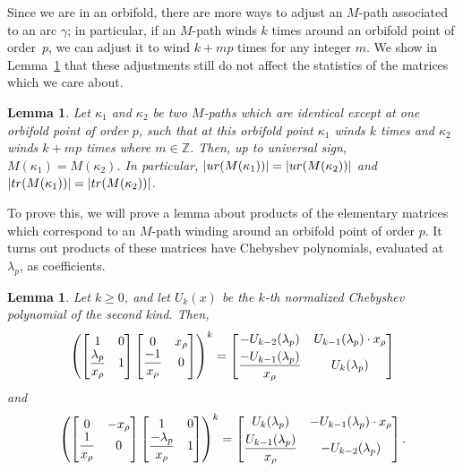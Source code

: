 \documentclass[11pt]{article}
\newcommand{\Z}{\mathbb{Z}}
\numberwithin{equation}{section}
\newtheorem{Lemma}[Theorem]{Lemma}
\begin{document}
Since we are in an orbifold, there are more ways to adjust an $M$-path associated to an arc $\gamma$; in particular, if an $M$-path winds $k$ times around an orbifold point of order~$p$, we can adjust it to wind $k + m p$ times for any integer $m$. We show in Lemma~\ref{lem:Mpathdontcare} that these adjustments still do not affect the statistics of the matrices which we care about.

\begin{Lemma}\label{lem:Mpathdontcare}
Let $\kappa_1$ and $\kappa_2$ be two $M$-paths which are identical except at one orbifold point of order $p$, such that at this orbifold point $\kappa_1$ winds $k$ times and $\kappa_2$ winds $k + mp$ times where $m \in \Z$. Then, up to universal sign, $M(\kappa_1) = M(\kappa_2)$. In particular, $\vert {\rm ur}(M(\kappa_1)) \vert = \vert {\rm ur}(M(\kappa_2))\vert$ and $\vert {\rm tr}(M(\kappa_1)) \vert = \vert {\rm tr}(M(\kappa_2)) \vert $.
\end{Lemma}

To prove this, we will prove a lemma about products of the elementary matrices which correspond to an $M$-path winding around an orbifold point of order $p$. It turns out products of these matrices have Chebyshev polynomials, evaluated at~$\lambda_p$, as coefficients.

\begin{Lemma} \label{lem:ChebyshevMatrices}
Let $k \geq 0$, and let $U_k(x)$ be the $k$-th normalized Chebyshev polynomial of the second kind. Then,
\begin{equation}\label{eqn:chebymatrix}
\left( \begin{bmatrix} 1 & 0 \\ \dfrac{\lambda_p}{x_\rho} & 1 \end{bmatrix} \begin{bmatrix} 0 & x_\rho \\ \dfrac{-1}{x_\rho} & 0 \end{bmatrix} \right)^k = \begin{bmatrix} -U_{k-2} (\lambda_p) & U_{k-1}(\lambda_p) \cdot x_\rho \vspace{1mm}\\ \dfrac{-U_{k-1}(\lambda_p)}{x_\rho} & U_k(\lambda_p) \end{bmatrix}
\end{equation}
and
\begin{equation}\label{eqn:negchebymatrix}
\left( \begin{bmatrix} 0 & -x_\rho \\ \dfrac{1}{x_\rho} & 0 \end{bmatrix} \begin{bmatrix} 1 & 0 \\ \dfrac{-\lambda_p}{x_\rho} & 1 \end{bmatrix} \right)^k = \begin{bmatrix} U_{k} (\lambda_p) & -U_{k-1}(\lambda_p) \cdot x_\rho \vspace{1mm}\\ \dfrac{U_{k-1}(\lambda_p)}{x_\rho} & -U_{k-2}(\lambda_p) \end{bmatrix}.
\end{equation}
\end{Lemma}
\end{document}
